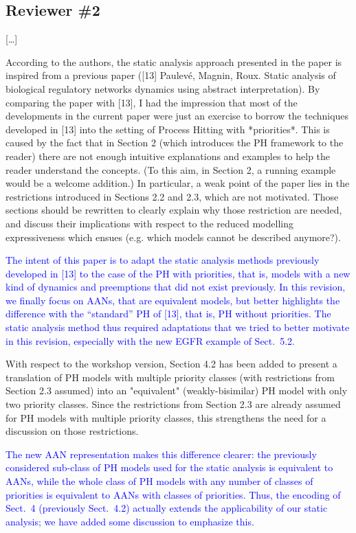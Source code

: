 \documentclass[11pt]{article}
\newcommand{\answer}[1]{\textcolor{blue}{#1}\vspace*{1em}}
\begin{document}
\subsection*{Reviewer \#2}

[…]

According to the authors, the static analysis approach presented in the paper is inspired from a previous paper ([13] Paulevé, Magnin, Roux. Static analysis of biological regulatory networks dynamics using abstract interpretation). By comparing the paper with [13], I had the impression that most of the developments in the current paper were just an exercise to borrow the techniques developed in [13] into the setting of Process Hitting with *priorities*. This is caused by the fact that in Section 2 (which introduces the PH framework to the reader) there are not enough intuitive explanations and examples to help the reader understand the concepts. (To this aim, in Section 2, a running example would be a welcome addition.)
In particular, a weak point of the paper lies in the restrictions introduced in Sections 2.2 and 2.3, which are not motivated. Those sections should be rewritten to clearly explain why those restriction are needed, and discuss their implications with respect to the reduced modelling expressiveness which ensues (e.g. which models cannot be described anymore?).

\answer{
The intent of this paper is to adapt the static analysis methods previously developed in [13] to the case of the PH with priorities, that is, models with a new kind of dynamics and preemptions that did not exist previously.
In this revision, we finally focus on AANs, that are equivalent models,
but better highlights the difference with the “standard” PH of [13],
that is, PH without priorities.
The static analysis method thus required adaptations
that we tried to better motivate in this revision,
especially with the new EGFR example of Sect.~5.2.
}

With respect to the workshop version, Section 4.2 has been added to present a translation of PH models with multiple priority classes (with restrictions from Section 2.3 assumed) into an "equivalent" (weakly-bisimilar) PH model with only two priority classes. Since the restrictions from Section 2.3 are already assumed for PH models with multiple priority classes, this strengthens the need for a discussion on those restrictions.

\answer{
The new AAN representation makes this difference clearer:
the previously considered sub-class of PH models used for the static analysis
is equivalent to AANs,
while the whole class of PH models with any number of classes of priorities
is equivalent to AANs with classes of priorities.
Thus, the encoding of Sect.~4 (previously Sect.~4.2)
actually extends the applicability
of our static analysis; we have added some discussion to emphasize this.
}
\end{document}
